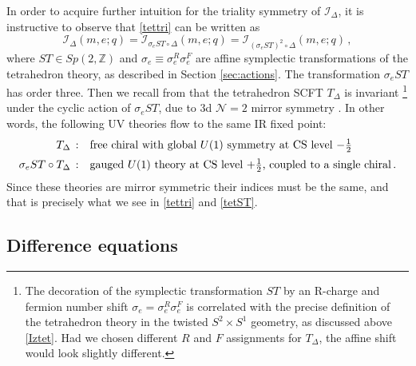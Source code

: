 \documentclass[11pt,letterpaper]{article}
\numberwithin{equation}{section}
\newcommand{\be}{\begin{equation}}
\newcommand{\ee}{\end{equation}}
\newcommand{\Z}{{\mathbb Z}}
\newcommand{\CI}{\mathcal{I}}
\newcommand{\CN}{\mathcal{N}}
\begin{document}
In order to acquire further intuition for the triality symmetry of $\CI_\Delta$, it is instructive to observe that \eqref{tettri} can be written as
%
\be \CI_\Delta(m,e;q) = \CI_{\sigma_eST\circ \Delta}(m,e;q)=\CI_{(\sigma_eST)^2\circ\Delta}(m,e;q)\,, \label{tetST} \ee
%
where $ST\in Sp(2,\Z)$ and $\sigma_e \equiv \sigma_e^R\sigma_e^F$ are affine symplectic transformations of the tetrahedron theory, as described in Section \ref{sec:actions}. The transformation $\sigma_eST$ has order three. Then we recall from \cite{DGG} that the tetrahedron SCFT $T_\Delta$ is invariant%
%
\footnote{The decoration of the symplectic transformation $ST$ by an R-charge and fermion number shift $\sigma_e=\sigma^R_e\sigma^F_e$ is correlated with the precise definition of the tetrahedron theory in the twisted $S^2\times S^1$ geometry, as discussed above \eqref{Iztet}. Had we chosen different $R$ and $F$ assignments for $T_\Delta$, the affine shift would look slightly different.} %
%
under the cyclic action of $\sigma_eST$, due to 3d $\CN=2$ mirror symmetry \cite{IS, AHISS, dBHOY, dBHO}. In other words, the following UV theories flow to the same IR fixed point:
%
\be
\begin{array}{r@{\quad}l}
T_\Delta\,: & \text{free chiral with global $U(1)$ symmetry at CS level $-\tfrac12$}\\[.2cm]
\sigma_eST\circ T_\Delta\,: & \text{gauged $U(1)$ theory at CS level $+\tfrac12$, coupled to a single chiral}\,.
\end{array}
\ee
%
Since these theories are mirror symmetric their indices must be the same, and that is precisely what we see in \eqref{tettri} and \eqref{tetST}.





\subsection{Difference equations}
\label{sec:tetdiff}
\end{document}

